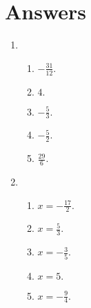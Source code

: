 \documentclass[a4paper,12pt]{exam}
\begin{document}
\newpage

\section*{Answers}\begin{enumerate}
\item
	
	\begin{enumerate}
		\item
			${- \frac{31}{12}.}$
		\item
			${4.}$
		\item
			${- \frac{5}{3}.}$
		\item
			${- \frac{5}{2}.}$
		\item
			${\frac{29}{6}.}$
	\end{enumerate}

\item
	
	\begin{enumerate}
		\item
			${x = - \frac{17}{2}.}$
		\item
			${x = \frac{5}{3}.}$
		\item
			${x = - \frac{3}{5}.}$
		\item
			${x = 5.}$
		\item
			${x = - \frac{9}{4}.}$
	\end{enumerate}


\end{enumerate}
\end{document}
